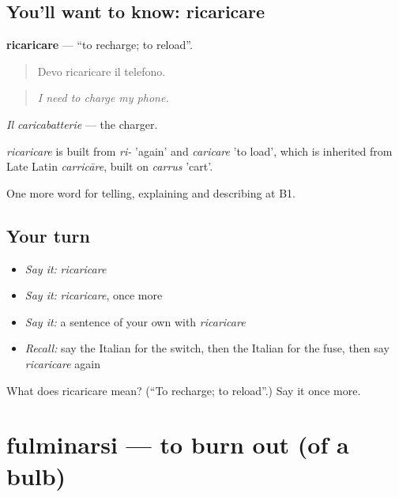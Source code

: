 \subsection*{You'll want to know: ricaricare}
\textbf{ricaricare} — \textquotedblleft{}to recharge; to reload\textquotedblright{}.

\begin{quote}
Devo ricaricare il telefono.
\end{quote}

\begin{quote}
\emph{I need to charge my phone.}
\end{quote}

\emph{Il caricabatterie} — the charger.

\begin{cousinweb}
\emph{ricaricare} is built from \emph{ri-} 'again' and \emph{caricare} 'to load', which is inherited from Late Latin \emph{carricāre}, built on \emph{carrus} 'cart'.
\end{cousinweb}

\begin{grammarlens}[title={What you've built}]
One more word for telling, explaining and describing at B1.
\end{grammarlens}

\subsection*{Your turn}
\begin{itemize}
\raggedright
  \item \emph{Say it:} \emph{ricaricare}
  \item \emph{Say it:} \emph{ricaricare}, once more
  \item \emph{Say it:} a sentence of your own with \emph{ricaricare}
  \item \emph{Recall:} say the Italian for the switch, then the Italian for the fuse, then say \emph{ricaricare} again
\end{itemize}

\begin{tcolorbox}[breakable,colback=teal!4,colframe=teal!35!black,title={Before you move on}]
What does ricaricare mean? (\textquotedblleft{}To recharge; to reload\textquotedblright{}.) Say it once more.
\end{tcolorbox}
\section[fulminarsi]{fulminarsi — to burn out (of a bulb)}

